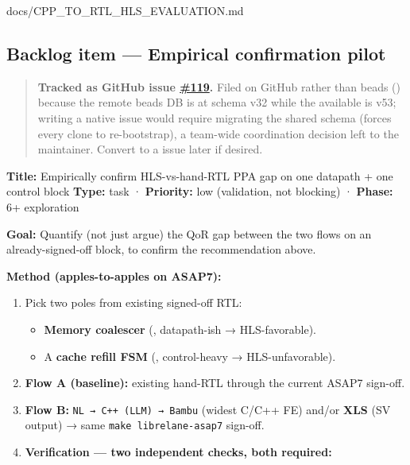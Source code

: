 \begin{relocated}{docs/CPP_TO_RTL_HLS_EVALUATION.md}
\subsection{Backlog item --- Empirical confirmation pilot}\label{tm:dec:cpp-to-rtl-hls-evaluation:backlog-item-empirical-confirmation-pilot}

\begin{quote}
\textbf{Tracked as GitHub issue
\href{https://github.com/chuanseng-ng/claude_verilog_test/issues/119}{\#119}.}
Filed on GitHub rather than beads () because the remote beads
DB is at schema v32 while the available  is v53; writing a
native  issue would require migrating the shared schema (forces
every clone to re-bootstrap), a team-wide coordination decision left to
the maintainer. Convert to a  issue later if desired.
\end{quote}

\textbf{Title:} Empirically confirm HLS-vs-hand-RTL PPA gap on one
datapath + one control block \textbf{Type:} task · \textbf{Priority:}
low (validation, not blocking) · \textbf{Phase:} 6+ exploration

\textbf{Goal:} Quantify (not just argue) the QoR gap between the two
flows on an already-signed-off block, to confirm the recommendation
above.

\textbf{Method (apples-to-apples on ASAP7):}

\begin{enumerate}
\def\labelenumi{\arabic{enumi}.}
\tightlist
\item
  Pick two poles from existing signed-off RTL:

  \begin{itemize}
  \tightlist
  \item
    \textbf{Memory coalescer} (, datapath-ish →
    HLS-favorable).
  \item
    A \textbf{cache refill FSM} (, control-heavy →
    HLS-unfavorable).
  \end{itemize}
\item
  \textbf{Flow A (baseline):} existing hand-RTL through the current
  ASAP7 sign-off.
\item
  \textbf{Flow B:}
  \texttt{NL\ →\ C+\allowbreak{}+\allowbreak{}\ (LLM)\ →\ Bambu} (widest
  C/C++ FE) and/or \textbf{XLS} (SV output) → same
  \texttt{make\ librelane-\allowbreak{}asap7} sign-off.
\item
  \textbf{Verification --- two independent checks, both required:}


\end{enumerate}
\end{relocated}
